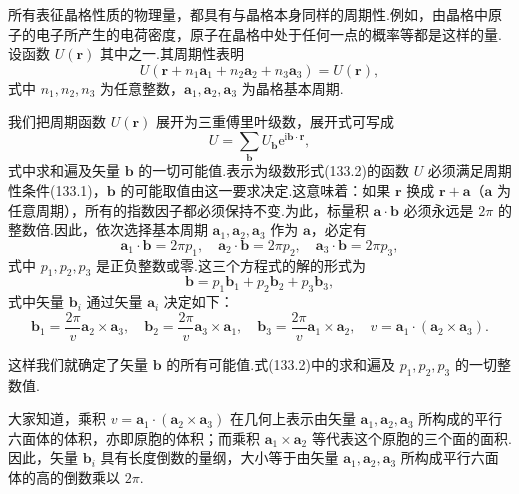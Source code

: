 所有表征晶格性质的物理量，都具有与晶格本身同样的周期性.例如，由晶格中原子的电子所产生的电荷密度，原子在晶格中处于任何一点的概率等都是这样的量.设函数 $U(\boldsymbol{r})$ 其中之一.其周期性表明
\begin{equation}
  U(\boldsymbol{r}+n_1\boldsymbol{a}_1+n_2\boldsymbol{a}_2+n_3\boldsymbol{a}_3)=U(\boldsymbol{r}),
\end{equation}
式中 $n_1,n_2,n_3$ 为任意整数，$\boldsymbol{a}_1,\boldsymbol{a}_2,\boldsymbol{a}_3$ 为晶格基本周期.

我们把周期函数 $U(\boldsymbol{r})$ 展开为三重傅里叶级数，展开式可写成
\begin{equation}
  U=\sum_{\boldsymbol{b}}U_{\boldsymbol{b}}\mathrm{e}^{\mathrm{i}\boldsymbol{b}\cdot\boldsymbol{r}},
\end{equation}
式中求和遍及矢量 $\boldsymbol{b}$ 的一切可能值.表示为级数形式(133.2)的函数 $U$ 必须满足周期性条件(133.1)，$\boldsymbol{b}$ 的可能取值由这一要求决定.这意味着：如果 $\boldsymbol{r}$ 换成 $\boldsymbol{r}+\boldsymbol{a}$（$\boldsymbol{a}$ 为任意周期），所有的指数因子都必须保持不变.为此，标量积 $\boldsymbol{a}\cdot\boldsymbol{b}$ 必须永远是 $2\pi$ 的整数倍.因此，依次选择基本周期 $\boldsymbol{a}_1,\boldsymbol{a}_2,\boldsymbol{a}_3$ 作为 $\boldsymbol{a}$，必定有
\begin{equation*}
  \boldsymbol{a}_1\cdot\boldsymbol{b}=2\pi p_1,\quad
  \boldsymbol{a}_2\cdot\boldsymbol{b}=2\pi p_2,\quad
  \boldsymbol{a}_3\cdot\boldsymbol{b}=2\pi p_3,
\end{equation*}
式中 $p_1,p_2,p_3$ 是正负整数或零.这三个方程式的解的形式为
\begin{equation}
  \boldsymbol{b}=p_1\boldsymbol{b}_1+p_2\boldsymbol{b}_2+p_3\boldsymbol{b}_3,
\end{equation}
式中矢量 $\boldsymbol{b}_i$ 通过矢量 $\boldsymbol{a}_i$ 决定如下：
\begin{equation}
  \boldsymbol{b}_1=\frac{2\pi}{v}\boldsymbol{a}_2\times\boldsymbol{a}_3,\quad
  \boldsymbol{b}_2=\frac{2\pi}{v}\boldsymbol{a}_3\times\boldsymbol{a}_1,\quad
  \boldsymbol{b}_3=\frac{2\pi}{v}\boldsymbol{a}_1\times\boldsymbol{a}_2,\quad
  v=\boldsymbol{a}_1\cdot(\boldsymbol{a}_2\times\boldsymbol{a}_3).
\end{equation}

这样我们就确定了矢量 $\boldsymbol{b}$ 的所有可能值.式(133.2)中的求和遍及 $p_1,p_2,p_3$ 的一切整数值.

大家知道，乘积 $v=\boldsymbol{a}_1\cdot(\boldsymbol{a}_2\times\boldsymbol{a}_3)$ 在几何上表示由矢量 $\boldsymbol{a}_1,\boldsymbol{a}_2,\boldsymbol{a}_3$ 所构成的平行六面体的体积，亦即原胞的体积；而乘积 $\boldsymbol{a}_1\times\boldsymbol{a}_2$ 等代表这个原胞的三个面的面积.因此，矢量 $\boldsymbol{b}_i$ 具有长度倒数的量纲，大小等于由矢量 $\boldsymbol{a}_1,\boldsymbol{a}_2,\boldsymbol{a}_3$ 所构成平行六面体的高的倒数乘以 $2\pi$.

